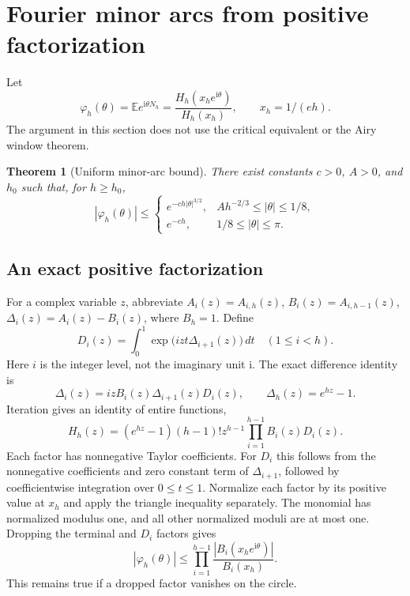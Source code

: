 \documentclass[11pt]{article}
\newtheorem{theorem}{Theorem}[section]
\theoremstyle{remark}\newtheorem{remark}[theorem]{Remark}
\newcommand{\E}{\mathbb E}
\begin{document}
\section{Fourier minor arcs from positive factorization}\label{xtw:airy:sec:minor}
Let
\begin{equation}\label{xtw:airy:eq:phih}
 \varphi_h(\theta)=\E e^{\mathrm i\theta N_h}
   =\frac{H_h(x_he^{\mathrm i\theta})}{H_h(x_h)},\qquad x_h=1/(eh).
\end{equation}
The argument in this section does not use the critical equivalent or the
Airy window theorem.

\begin{theorem}[Uniform minor-arc bound]\label{xtw:airy:thm:minor}
There exist constants $c>0$, $A>0$, and $h_0$ such that, for $h\ge h_0$,
\begin{equation}\label{xtw:airy:eq:minor}
 |\varphi_h(\theta)|\le
 \begin{cases}
 e^{-ch|\theta|^{3/2}},&Ah^{-2/3}\le|\theta|\le1/8,\\
 e^{-ch},&1/8\le|\theta|\le\pi.
 \end{cases}
\end{equation}
\end{theorem}

\subsection{An exact positive factorization}
For a complex variable $z$, abbreviate
$A_i(z)=A_{i,h}(z)$, $B_i(z)=A_{i,h-1}(z)$,
$\Delta_i(z)=A_i(z)-B_i(z)$, where $B_h=1$. Define
\[
 D_i(z)=\int_0^1\exp\bigl(izt\Delta_{i+1}(z)\bigr)\,dt
 \quad(1\le i<h).
\]
Here $i$ is the integer level, not the imaginary unit $\mathrm i$.
The exact difference identity is
\[
 \Delta_i(z)=izB_i(z)\Delta_{i+1}(z)D_i(z),\qquad
 \Delta_h(z)=e^{hz}-1.
\]
Iteration gives an identity of entire functions,
\begin{equation}\label{xtw:airy:eq:factorization}
 H_h(z)=(e^{hz}-1)(h-1)!z^{h-1}
                 \prod_{i=1}^{h-1}B_i(z)D_i(z).
\end{equation}
Each factor has nonnegative Taylor coefficients. For $D_i$ this follows from
the nonnegative coefficients and zero constant term of $\Delta_{i+1}$,
followed by coefficientwise integration over $0\le t\le1$.
Normalize each factor by its positive value at $x_h$ and apply the triangle
inequality separately. The monomial has normalized modulus one, and all
other normalized moduli are at most one. Dropping the terminal and $D_i$
factors gives
\begin{equation}\label{xtw:airy:eq:dropfactors}
 |\varphi_h(\theta)|\le
 \prod_{i=1}^{h-1}\frac{|B_i(x_he^{\mathrm i\theta})|}{B_i(x_h)}.
\end{equation}
This remains true if a dropped factor vanishes on the circle.
\end{document}
